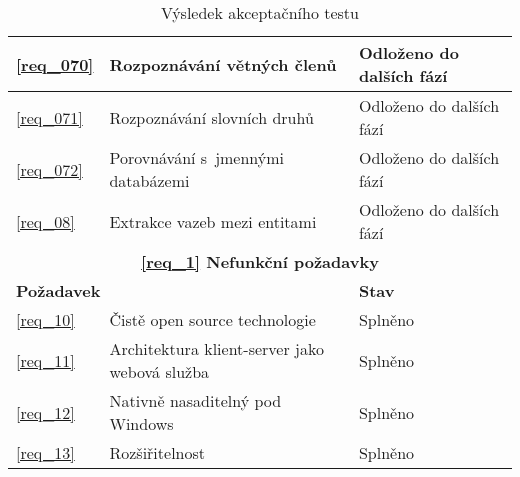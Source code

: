 \begin{table}
\begin{center}
\begin{tabular}{|l|l|p{6cm}|}
\ref{req_070} & Rozpoznávání větných členů & Odloženo do dalších fází\\ \hline 
\ref{req_071} & Rozpoznávání slovních druhů & Odloženo do dalších fází\\ \hline 
\ref{req_072} & Porovnávání s~jmennými databázemi & Odloženo do dalších fází\\ \hline 
\ref{req_08} & Extrakce vazeb mezi entitami & Odloženo do dalších fází\\ \hline 
\hline
\multicolumn{3}{|c|}{\textbf{\ref{req_1} Nefunkční požadavky}} \\ \hline
\multicolumn{2}{|l|}{\textbf{Požadavek}} & \textbf{Stav} \\ \hline
\ref{req_10} & Čistě open source technologie & Splněno\\ \hline 
\ref{req_11} & Architektura klient-server jako webová služba & Splněno\\ \hline
\ref{req_12} & Nativně nasaditelný pod Windows & Splněno\\ \hline
\ref{req_13} & Rozšiřitelnost & Splněno\\ \hline
\end{tabular}
\end{center}
\caption{Výsledek akceptačního testu}
\label{tab:test_accept}
\end{table}